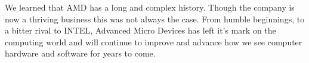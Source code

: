 \documentclass[../computer-history.tex]{subfiles}
\begin{document}
We learned that AMD has a long and complex history. Though the company is now a thriving business this was not always the case. From humble beginnings, to a bitter rival to INTEL, Advanced Micro Devices has left it's mark on the computing world and will continue to improve and advance how we see computer hardware and software for years to come.
\biblio
\end{document}
